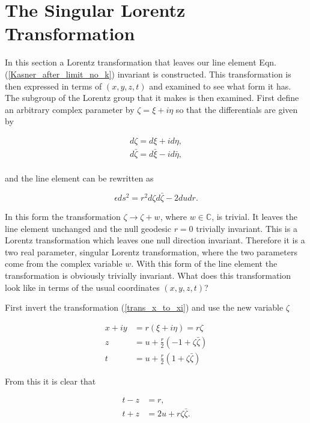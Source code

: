 \section{The Singular Lorentz Transformation}

In this section a Lorentz transformation that leaves our line element Eqn.(\ref{Kasner_after_limit_no_k}) invariant is constructed. This transformation is then expressed in terms of $(x,y,z,t)$ and examined to see what form it has. The subgroup of the Lorentz group that it makes is then examined. First define an arbitrary complex parameter by $\zeta = \xi + i \eta$ so that the differentials are given by

\begin{eqnarray*}
d\zeta = {d\xi} + i {d\eta}, \\
d\bar{\zeta} = {d\bar{\xi}} - i {d\bar{\eta}}, \\
\end{eqnarray*}

\noindent and the line element can be rewritten as

\begin{equation*}
\epsilon {ds^2} = r^2 {d\zeta}{d\bar{\zeta}} - 2 {du}{dr}.
\end{equation*}

\noindent In this form the transformation $\zeta \rightarrow \zeta + w$, where $w \in \mathbb{C}$, is trivial. It leaves the line element unchanged and the null geodesic $r = 0$ trivially invariant. This is a Lorentz transformation which leaves one null direction invariant. Therefore it is a two real parameter, singular Lorentz transformation, where the two parameters come from the complex variable $w$. With this form of the line element the transformation is obviously trivially invariant. What does this transformation look like in terms of the usual coordinates $(x,y,z,t)$?

First invert the transformation (\ref{trans_x_to_xi}) and use the new variable $\zeta$

\begin{align} \nonumber
x + iy  & = r (\xi + i \eta) = r \zeta \\\nonumber
z  & = u + \frac{r}{2}(-1 + \zeta \bar{\zeta}) \\\label{Singular_Trans_x,y,z,t_xi,eta,r,u_first}
t &  = u + \frac{r}{2}(1 + \zeta \bar{\zeta})
\end{align}

\noindent From this it is clear that

\begin{align*}
t - z & = r, \\
t + z & = 2 u + r \zeta \bar{\zeta}. 
\end{align*}

